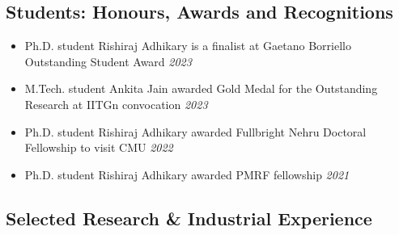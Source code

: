 \documentclass[letter,10pt]{article}
\begin{document}
\subsection*{\sc \textbf{Students: Honours, Awards and Recognitions}\hspace{5pt}\noindent\hrulefill}
\begin{itemize}
\item[]{Ph.D. student Rishiraj Adhikary is a finalist at Gaetano Borriello Outstanding Student Award} \hfill\textit{2023}
\item[]{M.Tech. student Ankita Jain awarded Gold Medal for the Outstanding Research at IITGn convocation} \hfill\textit{2023}
\item[]{Ph.D. student Rishiraj Adhikary awarded Fullbright Nehru Doctoral Fellowship to visit CMU} \hfill\textit{2022}
\item[]{Ph.D. student Rishiraj Adhikary awarded PMRF fellowship} \hfill\textit{2021}
   
    
\end{itemize}


\subsection*{\sc \textbf{Selected Research \& Industrial Experience}\hspace{5pt}\noindent\hrulefill}
\end{document}
